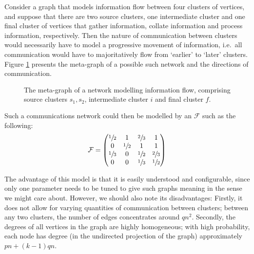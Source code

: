 Consider a graph that models information flow between four clusters of vertices, and suppose that
there are two source clusters, one intermediate cluster and one final cluster of vertices that 
gather information, collate information and process information, respectively. Then the nature of 
communication between clusters would necessarily have to model a progressive movement of 
information, i.e.\ all communication would have to majoritatively flow from `earlier' to `later' 
clusters. Figure \ref{figure:infoflow} presents the meta-graph of a possible such network and the 
directions of communication. 
\begin{figure}
	\begin{center}
	\end{center}
	\caption{The meta-graph of a network modelling information flow, comprising source clusters
	$s_1, s_2$, intermediate cluster $i$ and final cluster $f$.}
	\label{figure:infoflow}
\end{figure}
Such a communications network could then be modelled by an $\mathcal{F}$ such as the following:
$$
	\mathcal{F} = 
	\begin{pmatrix}
		\sfrac{1}{2} & 1 & \sfrac{2}{3} & 1 \\
		0 & \sfrac{1}{2} & 1 & 1 \\
		\sfrac{1}{3} & 0 & \sfrac{1}{2} & \sfrac{2}{3} \\
		0 & 0 & \sfrac{1}{3} & \sfrac{1}{2} \\
	\end{pmatrix}
$$

The advantage of this model is that it is easily understood and configurable, since only one 
parameter needs to be tuned to give such graphs meaning in the sense we might care about. However, 
we should also note its disadvantages: Firstly, it does not allow for varying quantities of 
communication between clusters; between any two clusters, the number of edges concentrates around 
$qn^2$. Secondly, the degrees of all vertices in the graph are highly homogeneous; with high 
probability, each node has degree (in the undirected projection of the graph) approximately $pn + 
(k-1) q n$. 

